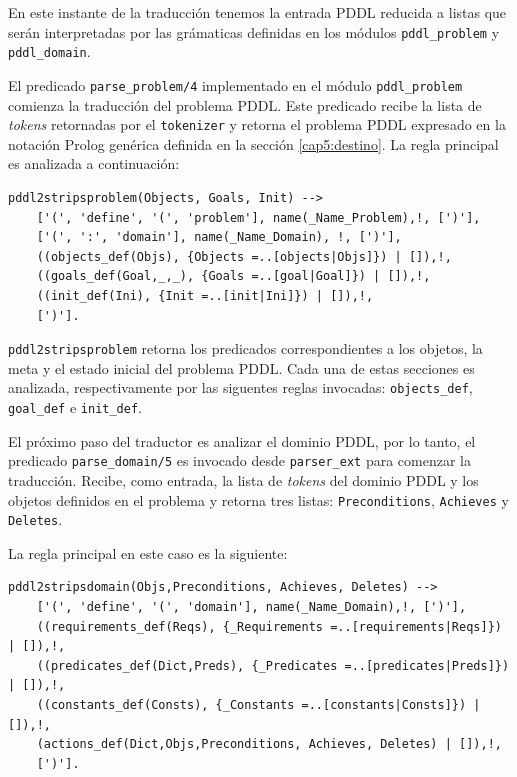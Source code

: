 
En este instante de la traducci\'on tenemos la entrada PDDL reducida 
a listas que ser\'an interpretadas por
las gr\'amaticas definidas en los m\'odulos \texttt{pddl\_problem}
y \texttt{pddl\_domain}.


El predicado \texttt{parse\_problem/4} implementado en el
m\'odulo \texttt{pddl\_problem} comienza la traducci\'on del problema
PDDL. Este predicado recibe la lista de \emph{tokens} retornadas por el 
\texttt{tokenizer} y retorna el problema PDDL expresado en la
notaci\'on Prolog gen\'erica definida en la
secci\'on \ref{cap5:destino}. 
La regla principal es analizada a continuaci\'on:

   \begin{verbatim}
pddl2stripsproblem(Objects, Goals, Init) --> 
    ['(', 'define', '(', 'problem'], name(_Name_Problem),!, [')'],
    ['(', ':', 'domain'], name(_Name_Domain), !, [')'], 
    ((objects_def(Objs), {Objects =..[objects|Objs]}) | []),!,  
    ((goals_def(Goal,_,_), {Goals =..[goal|Goal]}) | []),!, 
    ((init_def(Ini), {Init =..[init|Ini]}) | []),!, 
    [')'].
   \end{verbatim}

\texttt{pddl2stripsproblem} retorna los predicados correspondientes a
los objetos, la meta y el estado inicial del problema PDDL. Cada una
de estas secciones es analizada, respectivamente por las siguentes
reglas invocadas: \texttt{objects\_def}, \texttt{goal\_def} e \texttt{init\_def}.

El pr\'oximo paso del traductor es analizar el dominio PDDL, por lo tanto, el
predicado \texttt{parse\_domain/5} es invocado
desde \texttt{parser\_ext} para comenzar la traducci\'on. 
Recibe, como entrada, la lista de \emph{tokens} del dominio PDDL y los
objetos definidos en el problema y 
retorna tres listas: \texttt{Preconditions}, \texttt{Achieves} y \texttt{Deletes}.

La regla principal en este caso es la siguiente:

   \begin{verbatim}
pddl2stripsdomain(Objs,Preconditions, Achieves, Deletes) --> 
    ['(', 'define', '(', 'domain'], name(_Name_Domain),!, [')'], 
    ((requirements_def(Reqs), {_Requirements =..[requirements|Reqs]}) | []),!, 
    ((predicates_def(Dict,Preds), {_Predicates =..[predicates|Preds]}) | []),!, 
    ((constants_def(Consts), {_Constants =..[constants|Consts]}) |[]),!,
    (actions_def(Dict,Objs,Preconditions, Achieves, Deletes) | []),!,
    [')'].
   \end{verbatim}

